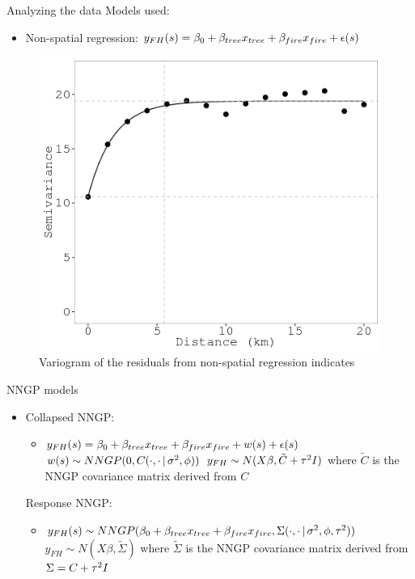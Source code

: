 \begin{frame}{Analyzing the data}
	Models used:
	\begin{itemize}
		\item Non-spatial regression: $y_{FH}(s) = \beta_0 + \beta_{tree} x_{tree} + \beta_{fire} x_{fire} + \epsilon(s)$
	\end{itemize}
	
	\begin{figure}
		\includegraphics[scale=0.25]{../figures/non-sp-resid-variog.png}
	\caption{Variogram of the residuals from non-spatial regression indicates }
	\end{figure}

\end{frame}

\begin{frame}{NNGP models}
\begin{itemize}
		\item Collapsed NNGP: 
		\begin{itemize}
			\item $y_{FH}(s) = \beta_0 + \beta_{tree} x_{tree} + \beta_{fire} x_{fire} + w(s)+ \epsilon(s)$
			\myitem $w(s) \sim NNGP(0,C(\cdot,\cdot \,|\, \sigma^2, \phi))$
			\myitem $y_{FH} \sim N(X\beta, \tilde C + \tau^2 I)$ where $\tilde C$ is the NNGP covariance matrix derived from $C$
		\end{itemize}
		
		\myitem Response NNGP: 
		\begin{itemize}
		\item $y_{FH}(s) \sim NNGP( \beta_0 + \beta_{tree} x_{tree} + \beta_{fire} x_{fire}, \Sigma(\cdot, \cdot \,|\, \sigma^2, \phi, \tau^2)) $
		\myitem $y_{FH} \sim N(X\beta, \tilde \Sigma)$ where $\tilde \Sigma$ is the NNGP covariance matrix derived from $\Sigma = C + \tau^2 I$
		\end{itemize}
	
\end{itemize}
\end{frame}
	

